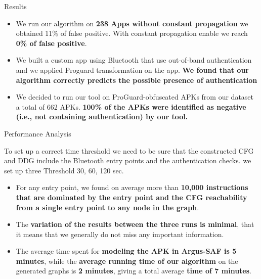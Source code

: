 \documentclass[10pt]{beamer}
\begin{document}
\begin{frame}[fragile]{Results}

\begin{itemize}

\item We run our algorithm on {\bf 238 Apps without constant
    propagation} we obtained 11\% of false positive. With constant
  propagation enable we reach {\bf 0\% of false positive}.

\item We built a custom app using Bluetooth that use out-of-band
  authentication and we applied Proguard transformation on the
  app. {\bf We found that our algorithm correctly predicts the
    possible presence of authentication}

\item We decided to run our tool on ProGuard-obfuscated APKs from our
  dataset a total of 662 APKs. {\bf 100\% of the APKs were identified
    as negative (i.e., not containing authentication) by our tool.}
  

\end{itemize}

\end{frame}

\begin{frame}[fragile]{Performance Analysis}

  To set up a correct time threshold we need to be sure that the
  constructed CFG and DDG include the Bluetooth entry points and the
  authentication checks. we set up three Threshold 30, 60, 120 sec.
  
\begin{itemize}

\item For any entry point, we found on average more than {\bf 10,000
    instructions that are dominated by the entry point and the CFG
    reachability from a single entry point to any node in the graph}.
  
\item The {\bf variation of the results between the three runs is
    minimal}, that it means that we generally do not miss any
  important information.
  
\item The average time spent for {\bf modeling the APK in Argus-SAF is
    5 minutes}, while the {\bf average running time of our algorithm}
  on the generated graphs is {\bf 2 minutes}, giving a total average
  {\bf time of 7 minutes}.
  
\end{itemize}

\end{frame}
\end{document}
